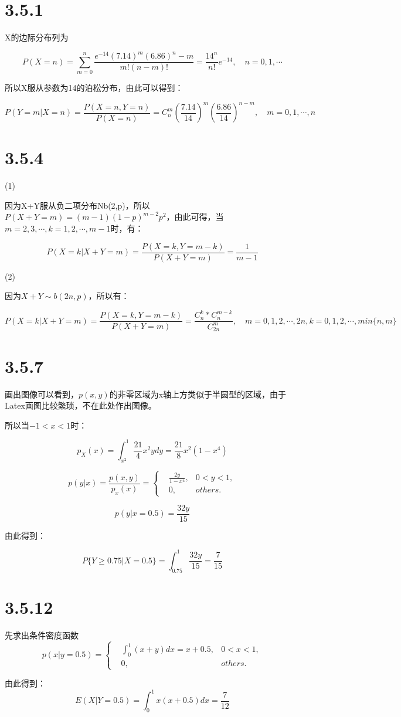 \documentclass{article}
\begin{document}


\section{3.5.1}
X的边际分布列为

$$P(X=n)=\sum^n_{m=0}\frac{e^{-14}(7.14)^m(6.86)^n-m}{m!(n-m)!}=\frac{14^n}{n!}e^{-14},\quad n=0,1,\cdots$$

所以X服从参数为14的泊松分布，由此可以得到：

$$P(Y=m|X=n)=\frac{P(X=n,Y=n)}{P(X=n)}=C^m_n(\frac{7.14}{14})^m(\frac{6.86}{14})^{n-m},\quad m=0,1,\cdots,n$$
\section{3.5.4}

(1)

因为X+Y服从负二项分布Nb(2,p)，所以$P(X+Y=m)=(m-1)(1-p)^{m-2}p^2$，由此可得，当$m=2,3,\cdots,k=1,2,\cdots,m-1$时，有：

$$P(X=k|X+Y=m)=\frac{P(X=k,Y=m-k)}{P(X+Y=m)}=\frac1{m-1}$$

(2)

因为$X+Y\sim b(2n,p)$，所以有：

$$P(X=k|X+Y=m)=\frac{P(X=k,Y=m-k)}{P(X+Y=m)}=\frac{C^k_n*C^{m-k}_{n}}{C^m_{2n}},\quad m=0,1,2,\cdots,2n,k=0,1,2,\cdots,min\{n,m\}$$
\section{3.5.7}

画出图像可以看到，$p(x,y)$的非零区域为x轴上方类似于半圆型的区域，由于Latex画图比较繁琐，不在此处作出图像。

所以当$-1<x<1$时：

$$p_X(x)=\int^1_{x^2}\frac{21}{4}x^2ydy=\frac{21}{8}x^2(1-x^4)$$


\begin{equation}
p(y|x)=\frac{p(x,y)}{p_x(x)}=\left\{
\begin{aligned}
&\frac{2y}{1-x^4},&0<y<1,\\
&0,&others.
\end{aligned}
\right.
\end{equation}

$$p(y|x=0.5)=\frac{32y}{15}$$

由此得到：

$$P\{Y\geq 0.75|X=0.5\}=\int^1_{0.75}\frac{32y}{15}=\frac7{15}$$
\section{3.5.12}

先求出条件密度函数
\begin{equation}
p(x|y=0.5)=\left\{
\begin{aligned}
&\int^1_0(x+y)dx=x+0.5,&0<x<1,\\
&0,&others.
\end{aligned}
\right.
\end{equation}

由此得到：
$$E(X|Y=0.5)=\int^1_0x(x+0.5)dx=\frac7{12}$$
\end{document}
